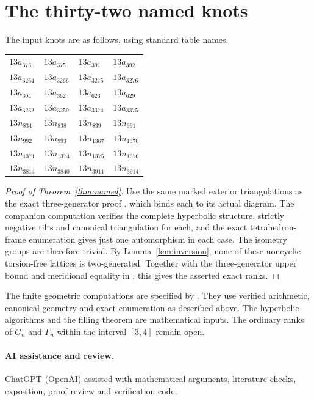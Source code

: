 \documentclass[11pt]{article}
\begin{document}
\section{The thirty-two named knots}\label{sec:named}
The input knots are as follows, using standard table names.
\begin{center}\small
\begin{tabular}{llll}
$13a_{373}$ & $13a_{375}$ & $13a_{391}$ & $13a_{392}$\\
$13a_{3264}$ & $13a_{3266}$ & $13a_{3275}$ & $13a_{3276}$\\
$13a_{304}$ & $13a_{362}$ & $13a_{623}$ & $13a_{629}$\\
$13a_{3232}$ & $13a_{3259}$ & $13a_{3374}$ & $13a_{3375}$\\
$13n_{834}$ & $13n_{838}$ & $13n_{839}$ & $13n_{991}$\\
$13n_{992}$ & $13n_{993}$ & $13n_{1367}$ & $13n_{1370}$\\
$13n_{1371}$ & $13n_{1374}$ & $13n_{1375}$ & $13n_{1376}$\\
$13n_{3814}$ & $13n_{3840}$ & $13n_{3911}$ & $13n_{3914}$
\end{tabular}
\end{center}
\begin{proof}[Proof of Theorem~\ref{thm:named}]
Use the same marked exterior triangulations as the exact
three-generator proof \cite{uppers}, which binds each to its
actual diagram. The companion computation verifies the complete
hyperbolic structure, strictly negative tilts and canonical
triangulation for each, and the exact tetrahedron-frame enumeration
gives just one automorphism in each case. The isometry groups are
therefore trivial. By Lemma~\ref{lem:inversion}, none of these
noncyclic torsion-free lattices is two-generated. Together with the
three-generator upper bound and meridional equality in \cite{uppers},
this gives the asserted exact ranks.
\end{proof}

The finite geometric computations are specified by
. They use verified
arithmetic, canonical geometry and exact enumeration as described
above. The hyperbolic algorithms and the filling theorem are
mathematical inputs. The ordinary ranks of $G_n$ and $\Gamma_n$
within the interval $[3,4]$ remain open.

\paragraph{AI assistance and review.}
ChatGPT (OpenAI) assisted with mathematical arguments, literature checks,
exposition, proof review and verification code.
\end{document}
